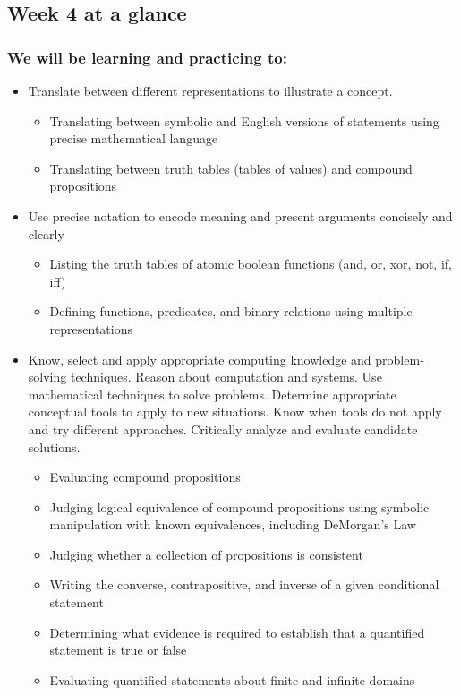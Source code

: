 \documentclass[12pt, oneside]{article}
\begin{document}
\begin{flushright}
\end{flushright} 
\subsection*{Week 4 at a glance}

\subsubsection*{We will be learning and practicing to:}
\begin{itemize}

\item Translate between different representations to illustrate a concept.
\begin{itemize}
   \item Translating between symbolic and English versions of statements using precise mathematical language
   \item Translating between truth tables (tables of values) and compound propositions
\end{itemize}

\item Use precise notation to encode meaning and present arguments concisely and clearly
\begin{itemize}
    \item Listing the truth tables of atomic boolean functions (and, or, xor, not, if, iff)
    \item Defining functions, predicates, and binary relations using multiple representations
\end{itemize}

\item Know, select and apply appropriate computing knowledge and problem-solving techniques. Reason about computation and systems. Use mathematical techniques to solve problems. Determine appropriate conceptual tools to apply to new situations. Know when tools do not apply and try different approaches. Critically analyze and evaluate candidate solutions.
\begin{itemize}
    \item Evaluating compound propositions
    \item Judging logical equivalence of compound propositions using symbolic manipulation with known equivalences, including DeMorgan's Law
    \item Judging whether a collection of propositions is consistent
    \item Writing the converse, contrapositive, and inverse of a given conditional statement
    \item Determining what evidence is required to establish that a quantified statement is true or false
    \item Evaluating quantified statements about finite and infinite domains
\end{itemize}

\end{itemize}
\end{document}
